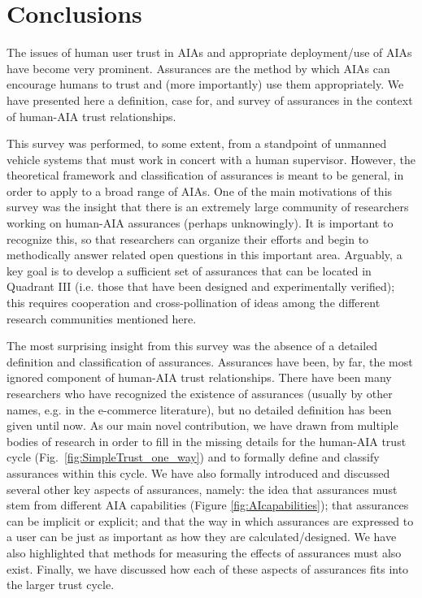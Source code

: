 \section{Conclusions}\label{sec:conclusions}
    The issues of human user trust in AIAs and appropriate deployment/use of AIAs have become very prominent. 
    Assurances are the method by which AIAs can encourage humans to trust and (more importantly) use them appropriately. 
    We have presented here a definition, case for, and survey of assurances in the context of human-AIA trust relationships. 
    
This survey was performed, to some extent, from a standpoint of unmanned vehicle systems that must work in concert with a human supervisor. 
However, the theoretical framework and classification of assurances is meant to be general, in order to apply to a broad range of AIAs. 
One of the main motivations of this survey was the insight that there is an extremely large community of researchers working on human-AIA assurances (perhaps unknowingly). 
It is important to recognize this, so that researchers can organize their efforts and begin to methodically answer related open questions in this important area. 
Arguably, a key goal is to develop a sufficient set of assurances that can be located in Quadrant III (i.e. those that have been designed and experimentally verified); this requires cooperation and cross-pollination of ideas among the different research communities mentioned here.

The most surprising insight from this survey was the absence of a detailed definition and classification of assurances. 
Assurances have been, by far, the most ignored component of human-AIA trust relationships. 
There have been many researchers who have recognized the existence of assurances (usually by other names, e.g. in the e-commerce literature), but no detailed definition has been given until now. 
As our main novel contribution, we have drawn from multiple bodies of research in order to fill in the missing details for the human-AIA trust cycle (Fig.~\ref{fig:SimpleTrust_one_way}) and to formally define and classify assurances within this cycle. 
We have also formally introduced and discussed several other key aspects of assurances, namely: the idea that assurances must stem from different AIA capabilities (Figure \ref{fig:AIcapabilities}); that assurances can be implicit or explicit; and that the way in which assurances are expressed to a user can be just as important as how they are calculated/designed. 
We have also highlighted that methods for measuring the effects of assurances must also exist. 
Finally, we have discussed how each of these aspects of assurances fits into the larger trust cycle. %
    
